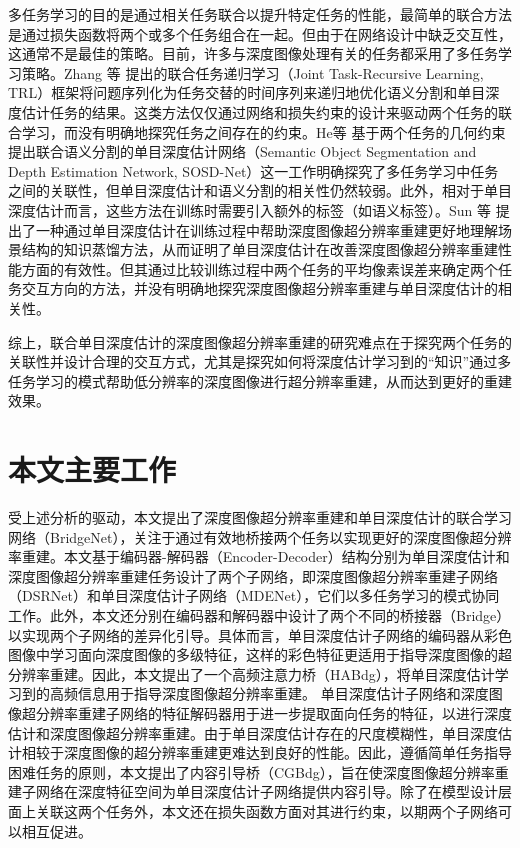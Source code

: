 多任务学习的目的是通过相关任务联合以提升特定任务的性能，最简单的联合方法是通过损失函数将两个或多个任务组合在一起。但由于在网络设计中缺乏交互性，这通常不是最佳的策略。目前，许多与深度图像处理有关的任务都采用了多任务学习策略。Zhang 等 \cite{DBLP:conf/eccv/ZhangCXJLY18} 提出的联合任务递归学习（Joint Task-Recursive Learning, TRL）框架将问题序列化为任务交替的时间序列来递归地优化语义分割和单目深度估计任务的结果。这类方法仅仅通过网络和损失约束的设计来驱动两个任务的联合学习，而没有明确地探究任务之间存在的约束。He等 \cite{DBLP:journals/corr/abs-2101-07422} 基于两个任务的几何约束提出联合语义分割的单目深度估计网络（Semantic Object Segmentation and Depth Estimation Network, SOSD-Net）这一工作明确探究了多任务学习中任务之间的关联性，但单目深度估计和语义分割的相关性仍然较弱。此外，相对于单目深度估计而言，这些方法在训练时需要引入额外的标签（如语义标签）。Sun 等 \cite{Sun2021cvpr} 提出了一种通过单目深度估计在训练过程中帮助深度图像超分辨率重建更好地理解场景结构的知识蒸馏方法，从而证明了单目深度估计在改善深度图像超分辨率重建性能方面的有效性。但其通过比较训练过程中两个任务的平均像素误差来确定两个任务交互方向的方法，并没有明确地探究深度图像超分辨率重建与单目深度估计的相关性。

综上，联合单目深度估计的深度图像超分辨率重建的研究难点在于探究两个任务的关联性并设计合理的交互方式，尤其是探究如何将深度估计学习到的“知识”通过多任务学习的模式帮助低分辨率的深度图像进行超分辨率重建，从而达到更好的重建效果。


\section{本文主要工作}

受上述分析的驱动，本文提出了深度图像超分辨率重建和单目深度估计的联合学习网络（BridgeNet），关注于通过有效地桥接两个任务以实现更好的深度图像超分辨率重建。本文基于编码器-解码器（Encoder-Decoder）结构分别为单目深度估计和深度图像超分辨率重建任务设计了两个子网络，即深度图像超分辨率重建子网络（DSRNet）和单目深度估计子网络（MDENet），它们以多任务学习的模式协同工作。此外，本文还分别在编码器和解码器中设计了两个不同的桥接器（Bridge）以实现两个子网络的差异化引导。具体而言，单目深度估计子网络的编码器从彩色图像中学习面向深度图像的多级特征，这样的彩色特征更适用于指导深度图像的超分辨率重建。因此，本文提出了一个高频注意力桥（HABdg），将单目深度估计学习到的高频信息用于指导深度图像超分辨率重建。 单目深度估计子网络和深度图像超分辨率重建子网络的特征解码器用于进一步提取面向任务的特征，以进行深度估计和深度图像超分辨率重建。由于单目深度估计存在的尺度模糊性，单目深度估计相较于深度图像的超分辨率重建更难达到良好的性能。因此，遵循简单任务指导困难任务的原则，本文提出了内容引导桥（CGBdg），旨在使深度图像超分辨率重建子网络在深度特征空间为单目深度估计子网络提供内容引导。除了在模型设计层面上关联这两个任务外，本文还在损失函数方面对其进行约束，以期两个子网络可以相互促进。

